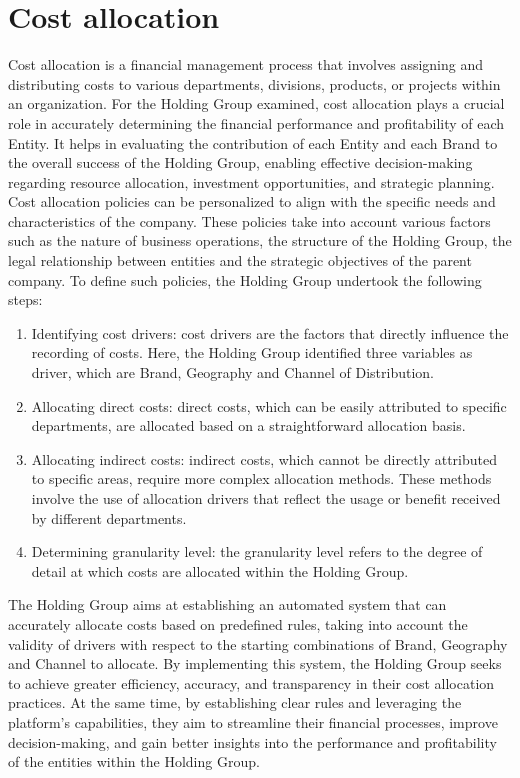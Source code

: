 \documentclass[12pt,a4paper,openright,twoside]{book}
\begin{document}
\section{Cost allocation}

Cost allocation is a financial management process that involves assigning and distributing costs to various departments, divisions, products, or projects within an organization. 
%
For the Holding Group examined, cost allocation plays a crucial role in accurately determining the financial performance and profitability of each Entity.
%
It helps in evaluating the contribution of each Entity and each Brand to the overall success of the Holding Group, enabling effective decision-making regarding resource allocation, investment opportunities, and strategic planning.
%
Cost allocation policies can be personalized to align with the specific needs and characteristics of the company. 
%
These policies take into account various factors such as the nature of business operations, the structure of the Holding Group, the legal relationship between entities and the strategic objectives of the parent company.
%
To define such policies, the Holding Group undertook the following steps:

\begin{enumerate}
    \item Identifying cost drivers: cost drivers are the factors that directly influence the recording of costs. Here, the Holding Group identified three variables as driver, which are Brand, Geography and Channel of Distribution.
    \item Allocating direct costs: direct costs, which can be easily attributed to specific departments, are allocated based on a straightforward allocation basis.
    \item Allocating indirect costs: indirect costs, which cannot be directly attributed to specific areas, require more complex allocation methods. These methods involve the use of allocation drivers that reflect the usage or benefit received by different departments.
    \item Determining granularity level: the granularity level refers to the degree of detail at which costs are allocated within the Holding Group. 
\end{enumerate}

The Holding Group aims at establishing an automated system that can accurately allocate costs based on predefined rules, taking into account the validity of drivers with respect to the starting combinations of Brand, Geography and Channel to allocate.
%
By implementing this system, the Holding Group seeks to achieve greater efficiency, accuracy, and transparency in their cost allocation practices.
%
At the same time,  by establishing clear rules and leveraging the platform's capabilities, they aim to streamline their financial processes, improve decision-making, and gain better insights into the performance and profitability of the entities within the Holding Group.
\end{document}

